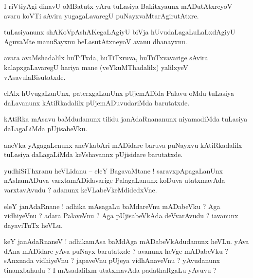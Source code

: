 \documentclass{article}
\begin{document}
\begin{mn}%
I riVtiyAgi dinavU oMBatutx yAru tuLasiya Bakitxyaunx mADutAtxreyoV avaru koVTi sAvira 
yugagaLavaregU puNayxvaMtarAgirutAtxre.
\end{mn}

\begin{mn}%
tuLasiyanunx shAKoVpAshAKegaLAgiyU biVja hUvudaLagaLuLaLxdAgiyU AguvaMte manuSayxnu beLasutAtxneyoV 
avanu dhanayxnu.
\end{mn}

\begin{mn}%
avara avaMshadalilx huTiTxda, huTiTxruva, huTuTxvavarige sAvira kalapxgaLavaregU hariya mane 
(veYkuMThadalilx) yalilxyeV vAsavulaBisutatxde.
\end{mn}

\begin{mn}%
elAlx hUvugaLanUnx, paterxgaLanUnx pUjemADida Palavu oMdu tuLasiya daLavanunx kAtiRkadalilx 
pUjemADuvudariMda barutatxde. 
\end{mn}

\begin{mn}%
kAtiRka mAsavu baMdudanunx tilidu janAdaRnananunx niyamadiMda tuLasiya daLagaLiMda pUjisabeVku.
\end{mn}

\begin{mn}%
aneVka yAgagaLenunx aneVkabAri mADidare baruva puNayxvu kAtiRkadalilx tuLasiya daLagaLiMda 
keVshavannx pUjisidare barutatxde.
\end{mn}


\begin{mn}%
yudhiSiThxranu heVLidanu -- eleY BagavaMtane ! saravxpApagaLanUnx nAshamADuva varxtamADidavarige 
PalagaLanunx koDuva utatxmavAda varxtavAvudu ? adanunx keVLabeVkeMdidedxVne.
\end{mn}

\begin{mn}%
eleY janAdaRnane ! adhika mAsagaLu baMdareVnu mADabeVku ? Aga vidhiyeVnu ? adara PalaveVnu ? Aga 
pUjisabeVkAda deVvarAvudu ? iavanunx dayaviTuTx heVLu.
\end{mn}

\begin{mn}%
keY janAdaRnaneV ! adhikamAsa baMdAga mADabeVkAdudanunx heVLu. yAva dAna mADidare yAva puNayx 
barutatxde ? avanunx heVge mADabeVku ? sAnxnada vidhiyeVnu ? japaveVnu pUjeya vidhAnaveVnu ? 
yAvudanunx tinanxbahudu ? I mAsadalilxm utatxmavAda padathaRgaLu yAvuvu ?
\end{mn}
\end{document}
